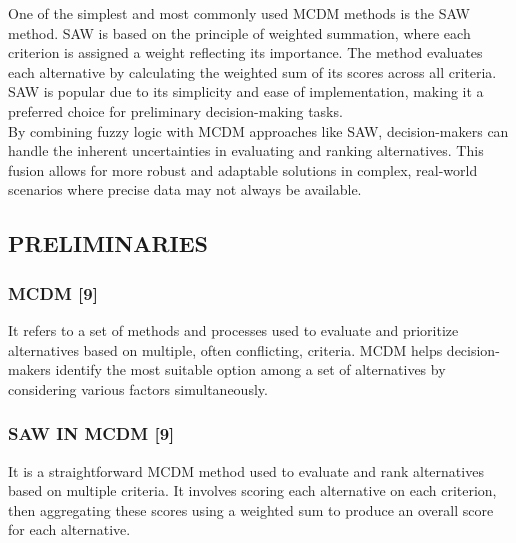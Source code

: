 \documentclass[12pt,a4paper]{article}
\begin{document}
One of the simplest and most commonly used MCDM methods is the SAW method. SAW is based on the principle of weighted summation, where each criterion is assigned a weight reflecting its importance. The method evaluates each alternative by calculating the weighted sum of its scores across all criteria. SAW is popular due to its simplicity and ease of implementation, making it a preferred choice for preliminary decision-making tasks.\\

By combining fuzzy logic with MCDM approaches like SAW, decision-makers can handle the inherent uncertainties in evaluating and ranking alternatives. This fusion allows for more robust and adaptable solutions in complex, real-world scenarios where precise data may not always be available.

\subsection{PRELIMINARIES}
\subsubsection*{MCDM [9]}
\hspace{1em}It refers to a set of methods and processes used to evaluate and prioritize alternatives based on multiple, often conflicting, criteria. MCDM helps decision-makers identify the most suitable option among a set of alternatives by considering various factors simultaneously.


\subsubsection*{SAW IN MCDM [9]}
\hspace{1em}It is a straightforward MCDM method
used to evaluate and rank alternatives based on multiple criteria. It
involves scoring each alternative on each criterion, then aggregating
these scores using a weighted sum to produce an overall score for each
alternative.
\end{document}
